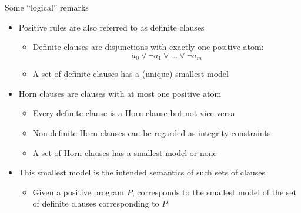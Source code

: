 \begin{frame}{Some ``logical'' remarks}
  \begin{itemize}
  \item <2-> Positive rules are also referred to as \alert<1-2>{definite clauses}
    \begin{itemize}
    \item Definite clauses are disjunctions with \alert<1>{exactly one} positive atom:
      \[
      a_0\vee\neg a_1\vee\dots\vee\neg a_m
      \]
    \item A set of definite clauses has a (unique) \alert<3>{smallest model}
    \end{itemize}
    \medskip
  \item<3-> \alert<2>{Horn clauses} are clauses with \alert<2>{at most} one positive atom
    \begin{itemize}
    \item Every definite clause is a Horn clause but not vice versa
    \item Non-definite Horn clauses can be regarded as integrity constraints
      \smallskip
    \item A set of Horn clauses has a \alert<3>{smallest model} or none
    \end{itemize}
    \medskip
  \item<4-> This \alert<3>{smallest model} is the intended semantics of such sets of clauses
    \begin{itemize}
    \item Given a positive program $P$,
     corresponds to the smallest model of the set of
    definite clauses corresponding to $P$
  \end{itemize}
\end{itemize}
\end{frame}
%
